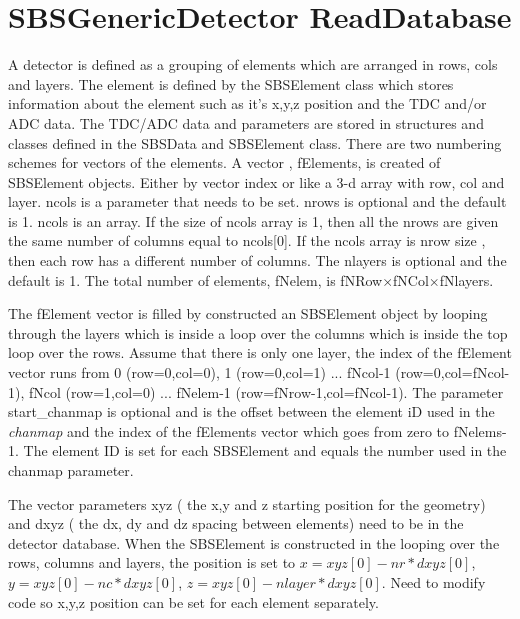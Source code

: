 \documentclass[11pt]{article}
\begin{document}
\section{SBSGenericDetector ReadDatabase}
A detector is defined as a grouping of elements which are arranged in rows, cols and layers.
The element is defined by the SBSElement class which stores information about the element
such as it's x,y,z position and the TDC and/or ADC data. The TDC/ADC data and parameters 
are stored in structures
and classes defined in the SBSData and SBSElement class.
There are two numbering schemes for vectors of the elements. A vector , fElements, is created of SBSElement objects.
Either by vector index or like a 3-d array with row, col and layer.
ncols is a parameter that needs to be set. nrows is optional and the default is 1. ncols is an array. 
If the size of ncols array is 1, then all the nrows are given the same number of columns equal to ncols[0].
If the ncols array is nrow size , then each row has a different number of columns.
The nlayers is optional and the default is 1. The total number of elements, fNelem, is fNRow$\times$fNCol$\times$fNlayers.

The fElement vector is filled by constructed an SBSElement object by looping through the layers which is inside a loop
over the columns which is inside the top loop over the rows. Assume that there is only one layer, the index of the fElement vector 
runs from 0 (row=0,col=0), 1 (row=0,col=1) ... fNcol-1 (row=0,col=fNcol-1), fNcol (row=1,col=0) ... fNelem-1 (row=fNrow-1,col=fNcol-1).
The parameter start\_chanmap is optional and is the offset between the element iD used in the {\it chanmap}
and the index of the fElements vector which goes from zero to fNelems-1. The element ID is set for each SBSElement and equals
the number used in the chanmap parameter. 



The vector parameters xyz ( the x,y and z starting position for the
geometry) and dxyz ( the dx, dy and dz spacing between elements) need to be in the detector database.
When the SBSElement is constructed in the looping over the rows, columns and layers, the position is  set to $x = xyz[0] - nr*dxyz[0]$,
$y = xyz[0] - nc*dxyz[0]$, $z = xyz[0] - nlayer*dxyz[0]$. {\color{red} Need to modify code so x,y,z position can be set for each element
	separately.}
\end{document}
